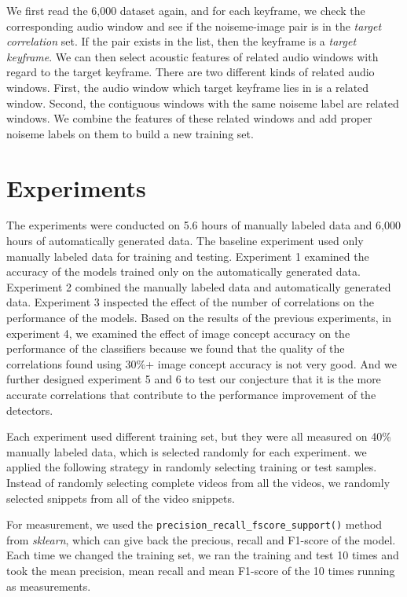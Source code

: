 \documentclass[conference, 11pt, onecolumn]{IEEEtran}
\begin{document}
We first read the 6,000 dataset again, and for each keyframe, we check the corresponding audio window and see if the noiseme-image pair is in the \emph{target correlation} set. If the pair exists in the list, then the keyframe is a \emph{target keyframe}. We can then select acoustic features of related audio windows with regard to the target keyframe. There are two different kinds of related audio windows. First, the audio window which target keyframe lies in is a related window. Second, the contiguous windows with the same noiseme label are related windows. We combine the features of these related windows and add proper noiseme labels on them to build a new training set.

\section{Experiments}
\label{section:experiments}
The experiments were conducted on 5.6 hours of manually labeled data and 6,000 hours of automatically generated data. The baseline experiment used only manually labeled data for training and testing. Experiment 1 examined the accuracy of the models trained only on the automatically generated data. Experiment 2 combined the manually labeled data and automatically generated data. Experiment 3 inspected the effect of the number of correlations on the performance of the models. Based on the results of the previous experiments, in experiment 4, we examined the effect of image concept accuracy on the performance of the classifiers because we found that the quality of the correlations found using 30\%+ image concept accuracy is not very good. And we further designed experiment 5 and 6 to test our conjecture that it is the more accurate correlations that contribute to the performance improvement of the detectors.

Each experiment used different training set, but they were all measured on 40\% manually labeled data, which is selected randomly for each experiment. we applied the following strategy in randomly selecting training or test samples. Instead of randomly selecting complete videos from all the videos, we randomly selected snippets from all of the video snippets.

For measurement, we used the {\tt{precision\_recall\_fscore\_support()}} method from \emph{sklearn}, which can give back the precious, recall and F1-score of the model. Each time we changed the training set, we ran the training and test 10 times and took the mean precision, mean recall and mean F1-score of the 10 times running as measurements.
\end{document}
